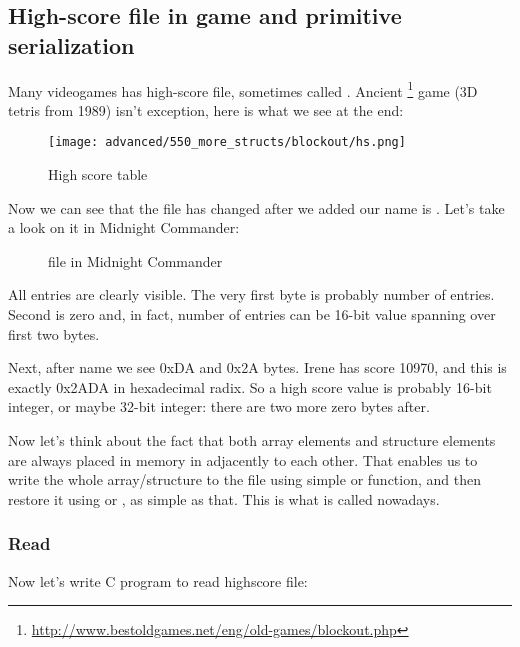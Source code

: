 \subsection{High-score file in  game and primitive serialization}

Many videogames has high-score file, sometimes called .
Ancient \footnote{\url{http://www.bestoldgames.net/eng/old-games/blockout.php}} game
(3D tetris from 1989) isn't exception, here is what we see at the end:

\begin{figure}[H]
\centering
\texttt{[image: advanced/550\_more\_structs/blockout/hs.png]}
\caption{High score table}
\end{figure}

Now we can see that the file has changed after we added our name is .
Let's take a look on it in Midnight Commander:

\begin{figure}[H]
\centering
{}
\caption{ file in Midnight Commander}
\end{figure}

All entries are clearly visible.
The very first byte is probably number of entries.
Second is zero and, in fact, number of entries can be 16-bit value spanning over first two bytes.

Next, after  name we see 0xDA and 0x2A bytes.
Irene has score 10970, and this is exactly 0x2ADA in hexadecimal radix.
So a high score value is probably 16-bit integer, or maybe 32-bit integer: there are two more zero bytes after.

Now let's think about the fact that both array elements and structure elements are always placed in memory in adjacently to each other.
That enables us to write the whole array/structure to the file using simple  or  function, 
and then restore it using  or , as simple as that.
This is what is called  nowadays.

\subsubsection{Read}

Now let's write C program to read highscore file:

